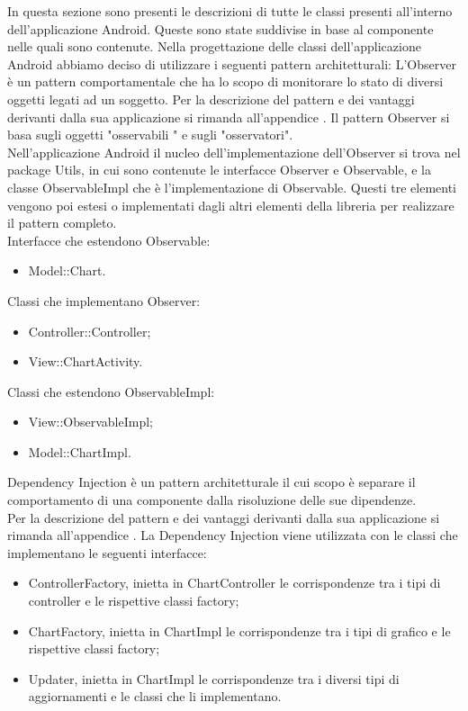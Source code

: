 		In questa sezione sono presenti le descrizioni di tutte le classi presenti all'interno dell'applicazione Android. Queste sono state suddivise in base al componente nelle quali sono contenute.
Nella progettazione delle classi dell'applicazione Android abbiamo deciso di utilizzare i seguenti pattern architetturali:
	L'Observer è un pattern comportamentale che ha lo scopo di monitorare lo stato di diversi oggetti legati ad un soggetto.
	Per la descrizione del pattern e dei vantaggi derivanti dalla sua applicazione si rimanda all'appendice .
	Il pattern Observer si basa sugli oggetti "osservabili " e sugli "osservatori". \\ Nell'applicazione Android il nucleo dell'implementazione dell'Observer si trova nel package Utils, in cui sono contenute le interfacce Observer e Observable, e la classe ObservableImpl che è l'implementazione di Observable. Questi tre elementi vengono poi estesi o implementati dagli altri elementi della libreria per realizzare il pattern completo.\\
	Interfacce che estendono Observable:
	\begin{itemize}
	\item Model::Chart.
	\end{itemize}
	Classi che implementano Observer:
	\begin{itemize}
	\item Controller::Controller;
	\item View::ChartActivity.
	\end{itemize}
	Classi che estendono ObservableImpl:
	\begin{itemize}
	\item View::ObservableImpl;
	\item Model::ChartImpl.
	\end{itemize}
	Dependency Injection è un pattern architetturale il cui scopo è separare il comportamento di una componente dalla risoluzione delle sue dipendenze.\\
	Per la descrizione del pattern e dei vantaggi derivanti dalla sua applicazione si rimanda all'appendice .
	La Dependency Injection viene utilizzata con le classi che implementano le seguenti interfacce:
	\begin{itemize}
	\item ControllerFactory, inietta in ChartController le corrispondenze tra i tipi di controller e le rispettive classi factory;
	\item ChartFactory, inietta in ChartImpl le  corrispondenze tra i tipi di grafico e le rispettive classi factory;
	\item Updater, inietta in ChartImpl le corrispondenze tra i diversi tipi di aggiornamenti e le classi che li implementano.
	\end{itemize}
